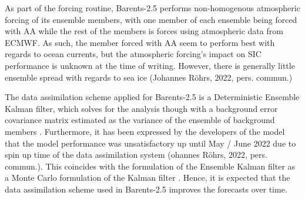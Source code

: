 \documentclass[../main/thesis.tex]{subfiles}
\begin{document}
As part of the forcing routine, Barents-2.5 performs non-homogenous atmospheric forcing of its ensemble members, with one member of each ensemble being forced with AA while the rest of the members is forces using atmospheric data from ECMWF. As such, the member forced with AA seem to perform best with regards to ocean currents, but the atmospheric forcing's impact on SIC performance is unknown at the time of writing. However, there is generally little ensemble spread with regards to sea ice (Johannes Röhrs, 2022, pers. commun.)

The data assimilation scheme applied for Barents-2.5 is a Deterministic Ensemble Kalman filter, which solves for the analysis though with a background error covariance matrix estimated as the variance of the ensemble of background members \cite{Roehrs2022}. Furthermore, it has been expressed by the developers of the model that the model performance was unsatisfactory up until May / June 2022 due to spin up time of the data assimilation system (ohannes Röhrs, 2022, pers. commun.). This coincides with the formulation of the Ensemble Kalman filter as a Monte Carlo formulation of the Kalman filter \cite{Sakov2008}. Hence, it is expected that the data assimilation scheme used in Barents-2.5 improves the forecasts over time.





\biblio
\end{document}
